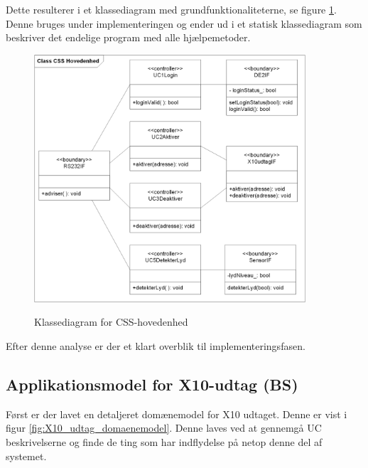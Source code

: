 Dette resulterer i et klassediagram med grundfunktionaliteterne, se figure \ref{fig:CSS_hovedenhed_class}. Denne bruges under implementeringen og ender ud i et statisk klassediagram som beskriver det endelige program med alle hjælpemetoder.

\begin{figure}[!htb]
     \centering
     { \includegraphics[width=0.9\textwidth]{Billeder/UML/CSS_hovedenhed_Class}}
     \caption{Klassediagram for CSS-hovedenhed}
     \label{fig:CSS_hovedenhed_class}
\end{figure}

Efter denne analyse er der et klart overblik til implementeringsfasen.

%
%
\subsection{Applikationsmodel for X10-udtag (BS)}
Først er der lavet en detaljeret domænemodel for X10 udtaget. Denne er vist i figur \ref{fig:X10_udtag_domaenemodel}. Denne laves ved at gennemgå UC beskrivelserne og finde de ting som har indflydelse på netop denne del af systemet.

